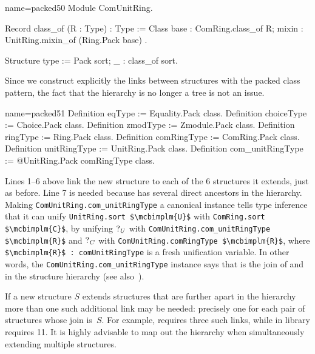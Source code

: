 \begin{coq}{name=packed50}{}
Module ComUnitRing.

Record class_of (R : Type) : Type := Class {
  base : ComRing.class_of R;
  mixin : UnitRing.mixin_of (Ring.Pack base)
}.

Structure type := Pack {sort; _ : class_of sort}.
\end{coq}

Since we construct explicitly the links between structures with the
packed class pattern, the fact that the hierarchy is no longer a tree
is not an issue.

\begin{coq}{name=packed51}{}
Definition eqType := Equality.Pack class.
Definition choiceType := Choice.Pack class.
Definition zmodType := Zmodule.Pack class.
Definition ringType := Ring.Pack class.
Definition comRingType := ComRing.Pack class.
Definition unitRingType := UnitRing.Pack class.
Definition com_unitRingType := @UnitRing.Pack comRingType class.
\end{coq}

Lines 1--6 above  link the new structure to each of the 
6 structures it
extends, just as before. Line 7 is needed because 
has several direct ancestors in the hierarchy.  Making
\lstinline/ComUnitRing.com_unitRingType/ a canonical 
instance tells type inference that it can unify
\lstinline/UnitRing.sort $\mcbimplm{U}$/ with
\lstinline/ComRing.sort $\mcbimplm{C}$/, by unifying $\mbox{?}_{U}$ with
\lstinline/ComUnitRing.com_unitRingType $\mcbimplm{R}$/ and
$\mbox{?}_{C}$ with
\lstinline/ComUnitRing.comRingType $\mcbimplm{R}$/,
where \lstinline/$\mcbimplm{R}$ : comUnitRingType/
is a fresh unification variable.
In other words, the \lstinline/ComUnitRing.com_unitRingType/ instance
says that  is the join of
 and  in the structure hierarchy (see
also~\cite[Section 5]{mahboubi:hal-00816703}).

If a new structure $S$ extends structures that are further apart in
the hierarchy more than one such additional link may be needed:
precisely one for each pair of structures whose join is~$S$. For example,
 requires three such links, while
 in library  requires 11. It is highly
advisable to map out the hierarchy when simultaneously extending
multiple structures.

